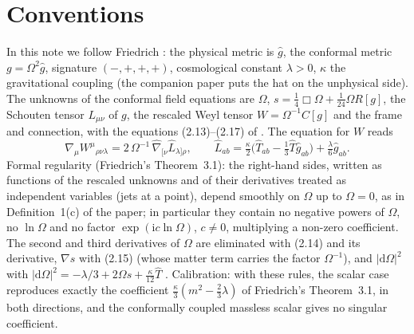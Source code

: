 \documentclass[11pt,a4paper]{article}
\newcommand{\dd}{\mathrm{d}}
\newcommand{\ii}{\mathrm{i}}
\begin{document}
\section{Conventions}
In this note we follow Friedrich \cite{Friedrich2015,Friedrich2017}: the physical metric is $\hat g$, the conformal metric $g=\Omega^{2}\hat g$, signature $(-,+,+,+)$, cosmological constant $\lambda>0$, $\kappa$ the gravitational coupling (the companion paper puts the hat on the unphysical side). The unknowns of the conformal field equations are $\Omega$, $s=\tfrac14\Box\Omega+\tfrac1{24}\Omega R[g]$, the Schouten tensor $L_{\mu\nu}$ of $g$, the rescaled Weyl tensor $W=\Omega^{-1}C[g]$ and the frame and connection, with the equations (2.13)--(2.17) of \cite{Friedrich2015}. The equation for $W$ reads
\begin{equation}
\nabla_{\mu}W^{\mu}{}_{\rho\nu\lambda}=2\,\Omega^{-1}\,\hat\nabla_{[\nu}\hat L_{\lambda]\rho},\qquad \hat L_{ab}=\tfrac{\kappa}{2}\big(\hat T_{ab}-\tfrac13\hat T\hat g_{ab}\big)+\tfrac{\lambda}{6}\hat g_{ab}.
\label{eq:weyl}
\end{equation}
Formal regularity (Friedrich's Theorem~3.1): the right-hand sides, written as functions of the rescaled unknowns and of their derivatives treated as independent variables (jets at a point), depend smoothly on $\Omega$ up to $\Omega=0$, as in Definition~1(c) of the paper; in particular they contain no negative powers of $\Omega$, no $\ln\Omega$ and no factor $\exp(\ii c\ln\Omega)$, $c\neq0$, multiplying a non-zero coefficient. The second and third derivatives of $\Omega$ are eliminated with (2.14) and its derivative, $\nabla s$ with (2.15) (whose matter term carries the factor $\Omega^{-1}$), and $|\dd\Omega|^{2}$ with $|\dd\Omega|^{2}=-\lambda/3+2\Omega s+\tfrac{\kappa}{12}\hat T$ \cite[(3.8)]{Friedrich2015}. Calibration: with these rules, the scalar case reproduces exactly the coefficient $\tfrac{\kappa}{3}(m^{2}-\tfrac23\lambda)$ of Friedrich's Theorem~3.1, in both directions, and the conformally coupled massless scalar gives no singular coefficient.
\end{document}
